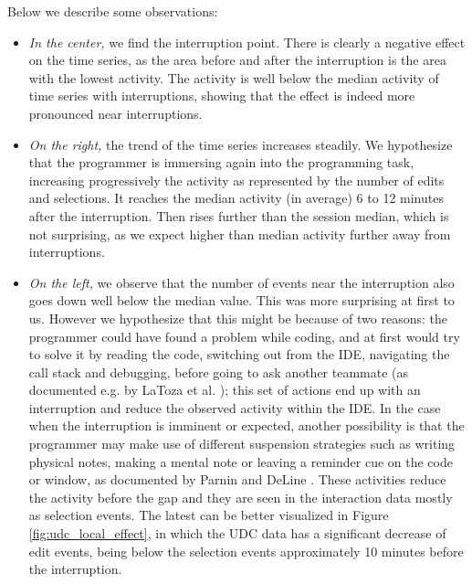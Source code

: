 Below we describe some observations:
\begin{itemize}
	\item \textit{In the center,} we find the interruption point. There is clearly a negative effect on the time series, as the area before and after the interruption is the area with the lowest activity. The activity is well below the median activity of time series with interruptions, showing that the effect is indeed more pronounced near interruptions. 
	
	\item \textit{On the right,} the trend of the time series increases steadily. We hypothesize that the programmer is immersing again into the programming task, increasing progressively the activity as represented by the number of edits and selections. It reaches the median activity (in average) 6 to 12 minutes after the interruption. Then rises further than the session median, which is not surprising, as we expect higher than median activity further away from interruptions.
	
	\item \textit{On the left,} we observe that the number of events near the interruption also goes down well below the median value. This was more surprising at first to us. However we hypothesize that this might be because of two reasons: the programmer could have found a problem while coding, and at first would try to solve it by reading the code, switching out from the IDE, navigating the call stack and debugging, before going to ask another teammate (as documented e.g. by LaToza et al. \cite{LVD06}); this set of actions end up with an interruption and reduce the observed activity within the IDE. In the case when the interruption is imminent or expected, another possibility is that the programmer may make use of different suspension strategies such as writing physical notes, making a mental note or leaving a reminder cue on the code or window, as documented by Parnin and DeLine \cite{PD10}. These activities reduce the activity before the gap and they are seen in the interaction data mostly as selection events. The latest can be better visualized in Figure \ref{fig:udc_local_effect}, in which the UDC data has a significant decrease of edit events, being below the selection events approximately 10 minutes before the interruption.
\end{itemize}

